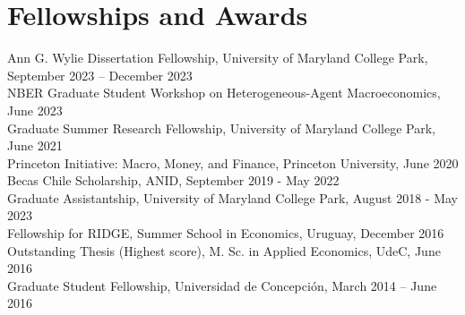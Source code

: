 \documentclass[10pt]{article}
\begin{document}
\section*{Fellowships and Awards}
Ann G. Wylie Dissertation Fellowship, University of Maryland College Park, September 2023 -- December 2023 \\
NBER Graduate Student Workshop on Heterogeneous-Agent Macroeconomics,  June 2023\\
Graduate Summer Research Fellowship, University of Maryland College Park, June 2021\\
Princeton Initiative: Macro, Money, and Finance, Princeton University, June 2020\\
Becas Chile Scholarship, ANID, September 2019 - May 2022\\
Graduate Assistantship, University of Maryland College Park, August 2018 - May 2023\\
Fellowship for RIDGE, Summer School in Economics, Uruguay, December 2016\\
Outstanding Thesis (Highest score), M. Sc. in Applied Economics, UdeC, June 2016\\
Graduate Student Fellowship, Universidad de Concepci\'on, March 2014 -- June 2016

\iffalse
\section*{Datasets}

``\emph{Chilean Economic Uncertainty Index}", which tracks economic uncertainty in the Chilean economy. Reported monthly by \href{http://www.clapesuc.cl/indicador/indice-de-incertidumbre-economica-iiec/}{CLAPES UC}.\\
``\emph{Chilean Economic Policy Uncertainty Index}", which tracks economic policy uncertainty in the Chilean economy. Reported monthly at the \href{http://www.policyuncertainty.com/chile_monthly.html}{Economic Policy Uncertainty} website managed by Scott Baker (Northwestern-Kellogg), Nicholas Bloom (Stanford) and Steve Davis (Chicago-Booth).
\fi


\end{document}
